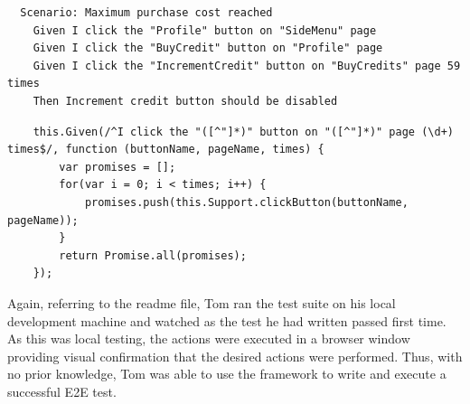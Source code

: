 \begin{listing}[H]
\begin{verbatim}
  Scenario: Maximum purchase cost reached
    Given I click the "Profile" button on "SideMenu" page
    Given I click the "BuyCredit" button on "Profile" page
    Given I click the "IncrementCredit" button on "BuyCredits" page 59 times
    Then Increment credit button should be disabled
\end{verbatim}
\label{lst:toms-first-test}
\end{listing}

\begin{listing}[H]
\begin{verbatim}
    this.Given(/^I click the "([^"]*)" button on "([^"]*)" page (\d+) times$/, function (buttonName, pageName, times) {
        var promises = [];
        for(var i = 0; i < times; i++) {
            promises.push(this.Support.clickButton(buttonName, pageName));
        }
        return Promise.all(promises);
    });
\end{verbatim}
\label{lst:additional-step-method}
\end{listing}

Again, referring to the readme file, Tom ran the test suite on his local development machine and watched as the test he had written passed first time. As this was local testing, the actions were executed in a browser window providing visual confirmation that the desired actions were performed. Thus, with no prior knowledge, Tom was able to use the framework to write and execute a successful E2E test.\\ 






















